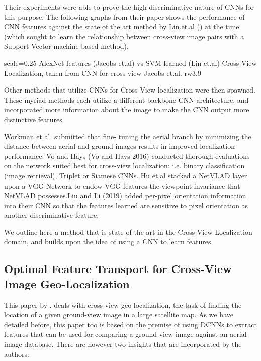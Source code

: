 Their experiments were able to prove the high discriminative nature of CNNs for this purpose. The following graphs from their paper shows the performance of CNN features against the state of the art method by Lin.et.al (\cite{Lin2013}) at the time (which sought to learn the relationship between cross-view image pairs with a Support Vector machine based method).

{scale=0.25}%
{AlexNet features (Jacobs et.al) vs SVM learned (Lin et.al) Cross-View Localization, taken from \cite{Jacobs2015}}%
{CNN for cross view Jacobs et.al.}%
{rw3.9} %

Other methods that utilize CNNs for Cross View localization were then spawned. These myriad methods each utilize a different backbone CNN architecture, and incorporated more information about the image to make the CNN output more distinctive features.

Workman et al. submitted that fine- tuning the aerial branch by minimizing the distance between aerial and ground images results in improved localization performance.  Vo and Hays (Vo and Hays 2016) conducted thorough evaluations on the network suited best for cross-view localization: i.e. binary classification (image retrieval), Triplet or Siamese CNNs. Hu et.al stacked a NetVLAD layer upon a VGG Network to endow VGG features the viewpoint invariance that NetVLAD possesses.Liu and Li (2019) added per-pixel orientation information into their CNN so that the features learned are sensitive to pixel orientation as another discriminative feature. 

We outline here a method that is state of the art in the Cross View Localization domain, and builds upon the idea of using a CNN to learn features. 

\subsection{Optimal Feature Transport for Cross-View Image Geo-Localization}
This paper by \cite{Shi2019}. deals with cross-view geo localization, the task of finding the location of a given ground-view image in a large satellite map. As we have detailed before, this paper too is based on the premise of using DCNNs to extract features that can be used for comparing a ground-view image against an aerial image database. There are however two insights that are incorporated by the authors:

